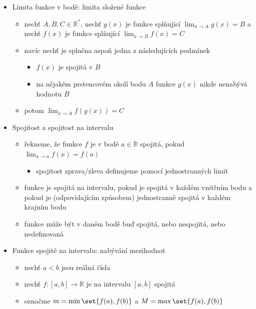 \begin{itemize}
\begin{itemize}
\item existuje-li $\delta\gt 0$ takové, že $f(x)\leq h(x)\leq g(x)$ pro každé $x\in P(c,\delta)$ a $\lim_{x\to c}f(x)=\lim_{x\to c}g(x)=A\in\mathbb R^*$ potom i $\lim_{x\to c}h(x)=A$
\begin{itemize}
\item v podstatě dva policajti
\end{itemize}
\end{itemize}
\item Limita funkce v bodě: limita složené funkce
\begin{itemize}
\item nechť $A,B,C\in\mathbb R^*$, nechť $g(x)$ je funkce splňující $\lim_{x\to A}g(x)=B$ a nechť $f(x)$ je funkce splňující $\lim_{x\to B}f(x)=C$
\item navíc nechť je splněna aspoň jedna z následujících podmínek
\begin{itemize}
\item $f(x)$ je spojitá v $B$
\item na nějakém prstencovém okolí bodu $A$ funkce $g(x)$ nikde nenabývá hodnotu $B$
\end{itemize}
\item potom $\lim_{x\to A}f(g(x))=C$
\end{itemize}
\item Spojitost a spojitost na intervalu
\begin{itemize}
\item řekneme, že funkce $f$ je v bodě $a\in\mathbb R$ spojitá, pokud $\lim_{x\to a}f(x)=f(a)$
\begin{itemize}
\item spojitost zprava/zleva definujeme pomocí jednostranných limit
\end{itemize}
\item funkce je spojitá na intervalu, pokud je spojitá v každém vnitřním bodu a pokud je (odpovídajícím způsobem) jednostranně spojitá v každém krajním bodu
\item funkce může být v daném bodě buď spojitá, nebo nespojitá, nebo nedefinovaná
\end{itemize}
\item Funkce spojité na intervalu: nabývání mezihodnot
\begin{itemize}
\item nechť $a\lt b$ jsou reálná čísla
\item nechť $f:[a,b]\to\mathbb R$ je na intervalu $[a,b]$ spojitá
\item označme $m=\min\set{f(a),f(b)}$ a $M=\max\set{f(a),f(b)}$

\end{itemize}
\end{itemize}
